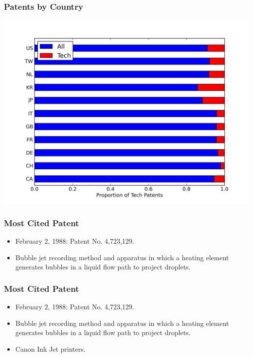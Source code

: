 \documentclass{beamer}
\begin{document}
\begin{frame}[t]\frametitle{Patents by Country} 

\begin{center}
  \includegraphics[scale=.5]{by_country_normalized.png}
  \label{fig:by_country_normalized}
\end{center}
\end{frame}

\begin{frame}[t]\frametitle{Most Cited Patent} 
  \begin{itemize}
    \item<+-> February 2, 1988: Patent No. 4,723,129.
    \item<+-> Bubble jet recording method and apparatus in which a heating element generates bubbles in a liquid flow path to project droplets.
  \end{itemize}
\end{frame}


\begin{frame}[t]\frametitle{Most Cited Patent} 
  \begin{itemize}
    \item February 2, 1988: Patent No. 4,723,129.
    \item Bubble jet recording method and apparatus in which a heating element generates bubbles in a liquid flow path to project droplets.
    \item Canon Ink Jet printers.
  \end{itemize}
\end{frame}
\end{document}
